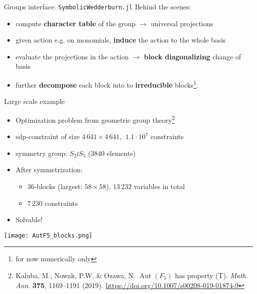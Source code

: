 \begin{frame}{Groups interface: \texttt{SymbolicWedderburn.jl}}
    Behind the scenes:
    \begin{itemize}
      \item compute \textbf{character table} of the group $\longrightarrow$ universal projections
      \item given action e.g. on monomials, \textbf{induce} the action to the whole basis
      \item evaluate the projections in the action $\longrightarrow$ \textbf{block diagonalizing} change of basis
      \item further \textbf{decompose} each block into to \textbf{irreducible} blocks\footnote{for now numerically only}.
    \end{itemize}
\end{frame}


\begin{frame}{Large scale example}

  \begin{itemize}
    \item Optimization problem from geometric group theory\footnote{Kaluba, M., Nowak, P.W. \& Ozawa, N. $\operatorname{Aut}(F_5)$ has property (T). \textit{Math. Ann}. \textbf{375}, 1169–1191 (2019). \url{https://doi.org/10.1007/s00208-019-01874-9}}
    \item sdp-constraint of size $4\,641\times 4\,641$, $~1.1\cdot 10^7$ constraints
    \item symmetry group: $S_2 \wr S_5$ ($3840$ elements)
    \item After symmetrization:
      \begin{itemize}
          \item $36$-blocks (largest: $58\times 58$), $13\,232$ variables in total
          \item $7\,230$ constraints
      \end{itemize}
    \item Solvable!    
  \end{itemize}

\end{frame}

\begin{frame}
\centering
\texttt{[image: AutF5\_blocks.png]}

\end{frame}

\begin{frame}
\centering
{}

\end{frame}




